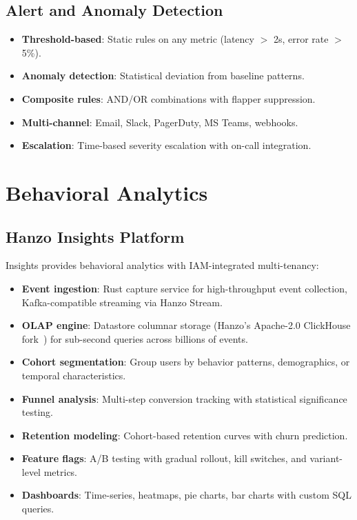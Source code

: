 \documentclass[11pt,letterpaper]{article}
\begin{document}
\subsection{Alert and Anomaly Detection}

\begin{itemize}
\item \textbf{Threshold-based}: Static rules on any metric (latency $>$ 2s, error rate $>$ 5\%).
\item \textbf{Anomaly detection}: Statistical deviation from baseline patterns.
\item \textbf{Composite rules}: AND/OR combinations with flapper suppression.
\item \textbf{Multi-channel}: Email, Slack, PagerDuty, MS Teams, webhooks.
\item \textbf{Escalation}: Time-based severity escalation with on-call integration.
\end{itemize}

\section{Behavioral Analytics}

\subsection{Hanzo Insights Platform}

Insights provides behavioral analytics with IAM-integrated multi-tenancy:

\begin{itemize}
\item \textbf{Event ingestion}: Rust capture service for high-throughput event collection, Kafka-compatible streaming via Hanzo Stream.
\item \textbf{OLAP engine}: Datastore columnar storage (Hanzo's Apache-2.0 ClickHouse fork~\cite{clickhouse}) for sub-second queries across billions of events.
\item \textbf{Cohort segmentation}: Group users by behavior patterns, demographics, or temporal characteristics.
\item \textbf{Funnel analysis}: Multi-step conversion tracking with statistical significance testing.
\item \textbf{Retention modeling}: Cohort-based retention curves with churn prediction.
\item \textbf{Feature flags}: A/B testing with gradual rollout, kill switches, and variant-level metrics.
\item \textbf{Dashboards}: Time-series, heatmaps, pie charts, bar charts with custom SQL queries.
\end{itemize}
\end{document}
